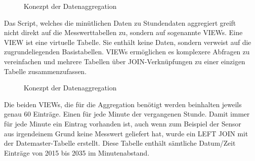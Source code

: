 \begin{figure}[htbp!]
	\centering
	\caption{Konezpt der Datenaggregation}
	\label{img:historical}
\end{figure}


Das Script, welches die minütlichen Daten zu Stundendaten aggregiert greift nicht direkt auf die Messwerttabellen zu, sondern auf sogenannte VIEWs. Eine VIEW ist eine virtuelle Tabelle. Sie enthält keine Daten, sondern verweist auf die zugrundeliegenden Basistabellen. VIEWs ermöglichen es komplexere Abfragen zu vereinfachen und mehrere Tabellen über JOIN-Verknüpfungen zu einer einzigen Tabelle zusammenzufassen.

\begin{figure}[htbp!]
	\centering
	\caption{Konezpt der Datenaggregation}
	\label{img:leftjoin}
\end{figure}


Die beiden VIEWs, die für die Aggregation benötigt werden beinhalten jeweils genau 60 Einträge. Einen für jede Minute der vergangenen Stunde. Damit immer für jede Minute ein Eintrag vorhanden ist, auch wenn zum Beispiel der Sensor aus irgendeinem Grund keine Messwert geliefert hat, wurde ein LEFT JOIN mit der Datemaster-Tabelle erstellt. Diese Tabelle enthält sämtliche Datum/Zeit Einträge von 2015 bis 2035 im Minutenabstand.





